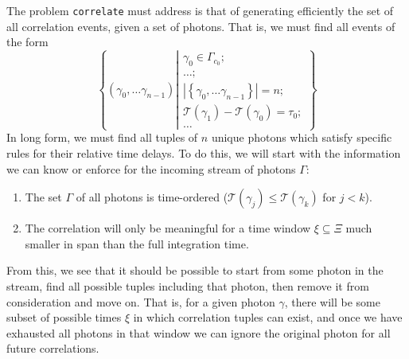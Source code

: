 \documentclass{article}
\newcommand{\braces}[1]{\ensuremath{\left\lbrace #1 \right\rbrace}}
\newcommand{\correlate}{\texttt{correlate}}
\newcommand{\abs}[1]{\ensuremath{\left|#1\right|}}
\newcommand{\Time}{\ensuremath{\mathcal{T}}}
\newcommand{\photon}{\ensuremath{\gamma}}
\newcommand{\photons}{\ensuremath{\Gamma}}
\newcommand{\integrationtime}{\ensuremath{\Xi}}
\newcommand{\timewindow}{\ensuremath{\xi}}
\begin{document}
The problem \correlate{} must address is that of generating efficiently the set of all correlation events, given a set of photons. That is, we must find all events of the form
\begin{equation}
\braces{(\photon_{0},\ldots\photon_{n-1})
        \left|
        \begin{aligned}
        \photon_{0}\in\photons_{c_{0}};\\
        \ldots; \\
        \abs{\braces{\photon_{0},\ldots\photon_{n-1}}}=n;\\
        \Time(\photon_{1})-\Time(\photon_{0})=\tau_{0};\\
        \ldots
        \end{aligned}
        \right.}
\end{equation}
In long form, we must find all tuples of $n$ unique photons which satisfy specific rules for their relative time delays. To do this, we will start with the information we can know or enforce for the incoming stream of photons \photons:
\begin{enumerate}
\item The set \photons{} of all photons is time-ordered ($\Time(\photon_{j})\le\Time(\photon_{k})$ for $j<k$).
\item The correlation will only be meaningful for a time window $\timewindow\subseteq\integrationtime$  much smaller in span than the full integration time.
\end{enumerate}
From this, we see that it should be possible to start from some photon in the stream, find all possible tuples including that photon, then remove it from consideration and move on. That is, for a given photon \photon, there will be some subset of possible times \timewindow{} in which correlation tuples can exist, and once we have exhausted all photons in that window we can ignore the original photon for all future correlations. 
\end{document}
